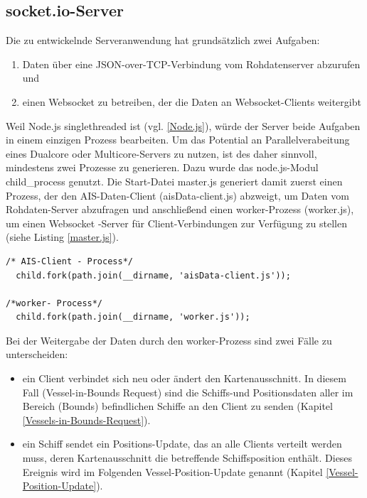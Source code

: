 \subsection{socket.io-Server}\label{socket.io-Server}
Die zu entwickelnde Serveranwendung hat grundsätzlich zwei Aufgaben: 
\begin{enumerate}
\item Daten über eine JSON-over-TCP-Verbindung vom Rohdatenserver abzurufen und
\item einen Websocket zu betreiben, der die Daten an Websocket-Clients weitergibt
\end{enumerate}
Weil Node.js singlethreaded ist (vgl. \ref{Node.js}), würde der Server beide Aufgaben in einem einzigen Prozess bearbeiten. Um das Potential an Parallelverabeitung eines Dualcore oder Multicore-Servers zu nutzen, ist des daher sinnvoll, mindestens zwei Prozesse zu generieren. Dazu wurde das node.js-Modul child\_process genutzt. Die Start-Datei master.js generiert damit zuerst einen Prozess, der den AIS-Daten-Client (aisData-client.js) abzweigt, um Daten vom Rohdaten-Server abzufragen und anschließend einen worker-Prozess (worker.js), um einen Websocket -Server für Client-Verbindungen zur Verfügung zu stellen (siehe Listing \ref{master.js}).
\begin{lstlisting}[caption=Generierung von Kindprozessen in master.js, firstnumber=16, label=master.js]
/* AIS-Client - Process*/
  child.fork(path.join(__dirname, 'aisData-client.js'));

/*worker- Process*/
  child.fork(path.join(__dirname, 'worker.js'));
\end{lstlisting}
Bei der Weitergabe der Daten durch den worker-Prozess sind zwei Fälle zu unterscheiden:
\begin{itemize}
\item ein Client verbindet sich neu oder ändert den Kartenausschnitt. In diesem Fall (Vessel-in-Bounds Request) sind die Schiffs-und Positionsdaten aller im Bereich (Bounds) befindlichen Schiffe an den Client zu senden (Kapitel \ref{Vessels-in-Bounds-Request}).
\item ein Schiff sendet ein Positions-Update, das an alle Clients verteilt werden muss, deren Kartenausschnitt die betreffende Schiffsposition enthält. Dieses Ereignis wird im Folgenden Vessel-Position-Update genannt (Kapitel \ref{Vessel-Position-Update}).
\end{itemize}
